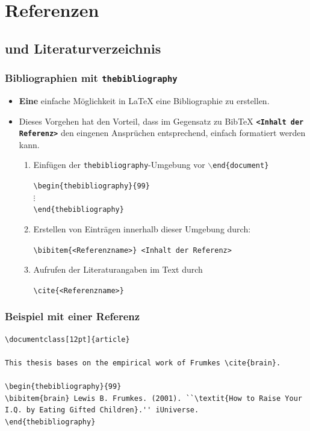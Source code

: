 \section{Referenzen}

\subsection{ und Literaturverzeichnis}


\begin{frame}[fragile,t]
\frametitle{Bibliographien mit \texttt{thebibliography}}
\begin{itemize}[<+->]
  \item \textbf{Eine} einfache Möglichkeit in LaTeX eine Bibliographie zu erstellen.
  \item Dieses Vorgehen hat den Vorteil, dass im Gegensatz zu BibTeX \textbf{\texttt{<Inhalt der Referenz>}} den eingenen Ansprüchen entsprechend, einfach formatiert werden kann.
  \begin{enumerate}[<+->]
\item Einfügen der \texttt{thebibliography}-Umgebung vor \texttt{$\backslash$end\{document\}}
  \begin{center}
  \lstinline[style=Latex]+\begin{thebibliography}{99}+\\
  $\vdots$\\
   \lstinline[style=Latex]+\end{thebibliography}+
  \end{center}
  \item Erstellen von Einträgen innerhalb dieser Umgebung durch:
  \begin{center}
  \lstinline[style=Latex]+\bibitem{<Referenzname>} <Inhalt der Referenz>+
  \end{center}
  \item Aufrufen der Literaturangaben im Text durch
  \begin{center}
  \lstinline[style=Latex]+\cite{<Referenzname>}+ 
  \end{center}
  \end{enumerate}
\end{itemize} 
\end{frame}

\begin{frame}[fragile,t]
\frametitle{Beispiel mit einer Referenz}
\begin{lstlisting}[style=Latex]
\documentclass[12pt]{article}

This thesis bases on the empirical work of Frumkes \cite{brain}.

\begin{thebibliography}{99}
\bibitem{brain} Lewis B. Frumkes. (2001). ``\textit{How to Raise Your I.Q. by Eating Gifted Children}.'' iUniverse.
\end{thebibliography}

\end{lstlisting}
\end{frame}

